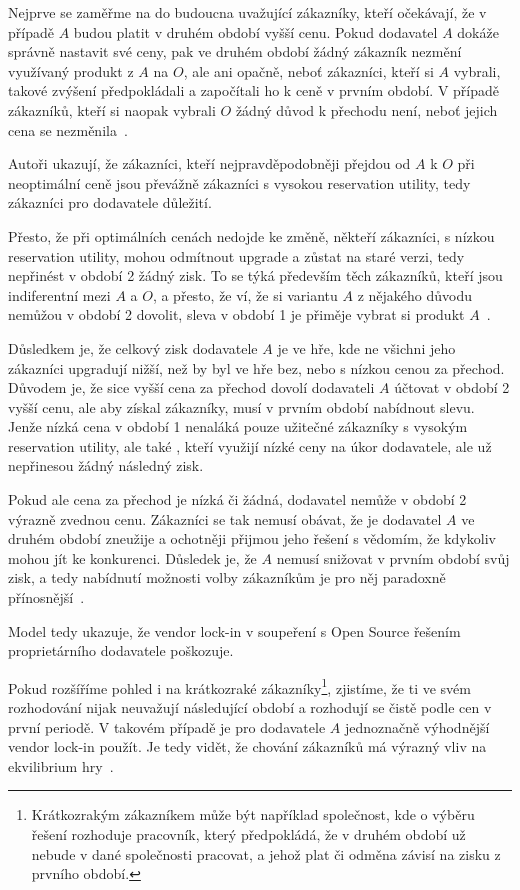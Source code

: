 \begin{multicols}{2}
	Nejprve se zaměřme na do budoucna uvažující zákazníky, kteří očekávají, že v případě $A$ budou platit v druhém období vyšší cenu. Pokud dodavatel $A$ dokáže správně nastavit své ceny, pak ve druhém období žádný zákazník nezmění využívaný produkt z $A$ na $O$, ale ani opačně, neboť zákazníci, kteří si $A$ vybrali, takové zvýšení předpokládali a započítali ho k ceně v prvním období. V případě zákazníků, kteří si naopak vybrali $O$ žádný důvod k přechodu není, neboť jejich cena se nezměnila~\cite[kap. 3: Lemma 1]{lock-in-competition}.

	Autoři ukazují, že zákazníci, kteří nejpravděpodobněji přejdou od $A$ k $O$ při neoptimální ceně jsou převážně zákazníci s vysokou reservation utility, tedy zákazníci pro dodavatele důležití.

	Přesto, že při optimálních cenách nedojde ke změně, někteří zákazníci, s nízkou reservation utility, mohou odmítnout upgrade a zůstat na staré verzi, tedy nepřinést v období 2 žádný zisk. To se týká především těch zákazníků, kteří jsou indiferentní mezi $A$ a $O$, a přesto, že ví, že si variantu $A$ z nějakého důvodu nemůžou v období 2 dovolit, sleva v období 1 je přiměje vybrat si produkt $A$~\cite[str. 6]{lock-in-competition}.

	Důsledkem je, že celkový zisk dodavatele $A$ je ve hře, kde ne všichni jeho zákazníci upgradují nižší, než by byl ve hře bez, nebo s nízkou cenou za přechod. Důvodem je, že sice vyšší cena za přechod dovolí dodavateli $A$ účtovat v období 2 vyšší cenu, ale aby získal zákazníky, musí v prvním období nabídnout slevu. Jenže nízká cena v období 1 nenaláká pouze užitečné zákazníky s vysokým reservation utility, ale také , kteří využijí nízké ceny na úkor dodavatele, ale už nepřinesou žádný následný zisk.

	Pokud ale cena za přechod je nízká či žádná, dodavatel nemůže v období 2 výrazně zvednou cenu. Zákazníci se tak nemusí obávat, že je dodavatel $A$ ve druhém období zneužije a ochotněji přijmou jeho řešení s vědomím, že kdykoliv mohou jít ke konkurenci. Důsledek je, že $A$ nemusí snižovat v prvním období svůj zisk, a tedy nabídnutí možnosti volby zákazníkům je pro něj paradoxně přínosnější~\cite[str. 7 a kap. 3: lemma 2]{lock-in-competition}.

	Model tedy ukazuje, že vendor lock-in v soupeření s Open Source řešením proprietárního dodavatele poškozuje.

	Pokud rozšíříme pohled i na krátkozraké zákazníky\footnote{Krátkozrakým zákazníkem může být například společnost, kde o výběru řešení rozhoduje pracovník, který předpokládá, že v druhém období už nebude v dané společnosti pracovat, a jehož plat či odměna závisí na zisku z prvního období.}, zjistíme, že ti ve svém rozhodování nijak neuvažují následující období a rozhodují se čistě podle cen v první periodě. V takovém případě je pro dodavatele $A$ jednoznačně výhodnější vendor lock-in použít. Je tedy vidět, že chování zákazníků má výrazný vliv na ekvilibrium hry~\cite[kap. 4]{lock-in-competition}.


\end{multicols}
